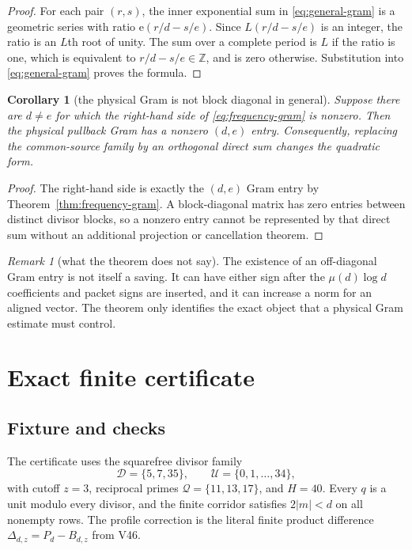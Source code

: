\documentclass[11pt]{article}
\newtheorem{corollary}[theorem]{Corollary}
\theoremstyle{definition}
\theoremstyle{remark}
\newtheorem{remark}[theorem]{Remark}
\newcommand{\ZZ}{\mathbb Z}
\newcommand{\Dd}{\mathcal D}
\newcommand{\UU}{\mathcal U}
\newcommand{\ee}{\mathrm e}
\newcommand{\muM}{\mu}
\begin{document}
\begin{proof}
For each pair $(r,s)$, the inner exponential sum in
\eqref{eq:general-gram} is a geometric series with ratio
$\ee(r/d-s/e)$.  Since $L(r/d-s/e)$ is an integer, the ratio is an $L$th root
of unity.  The sum over a complete period is $L$ if the ratio is one, which
is equivalent to $r/d-s/e\in\ZZ$, and is zero otherwise.  Substitution into
\eqref{eq:general-gram} proves the formula.
\end{proof}

\begin{corollary}[the physical Gram is not block diagonal in general]
\label{cor:physical-gram}
Suppose there are $d\ne e$ for which the right-hand side of
\eqref{eq:frequency-gram} is nonzero.  Then the physical pullback Gram has a
nonzero $(d,e)$ entry.  Consequently, replacing the common-source family by
an orthogonal direct sum changes the quadratic form.
\end{corollary}

\begin{proof}
The right-hand side is exactly the $(d,e)$ Gram entry by
Theorem~\ref{thm:frequency-gram}.  A block-diagonal matrix has zero entries
between distinct divisor blocks, so a nonzero entry cannot be represented by
that direct sum without an additional projection or cancellation theorem.
\end{proof}

\begin{remark}[what the theorem does not say]
The existence of an off-diagonal Gram entry is not itself a saving.  It can have
either sign after the $\muM(d)\log d$ coefficients and packet signs are
inserted, and it can increase a norm for an aligned vector.  The theorem only
identifies the exact object that a physical Gram estimate must control.
\end{remark}

\section{Exact finite certificate}

\subsection{Fixture and checks}

The certificate uses the squarefree divisor family
\[
 \Dd=\{5,7,35\},\qquad \UU=\{0,1,\ldots,34\},
\]
with cutoff $z=3$, reciprocal primes
$\mathcal Q=\{11,13,17\}$, and $H=40$.  Every $q$ is a unit modulo every
divisor, and the finite corridor satisfies $2|m|<d$ on all nonempty rows.
The profile correction is the literal finite product difference
$\Delta_{d,z}=P_d-B_{d,z}$ from V46.
\end{document}

